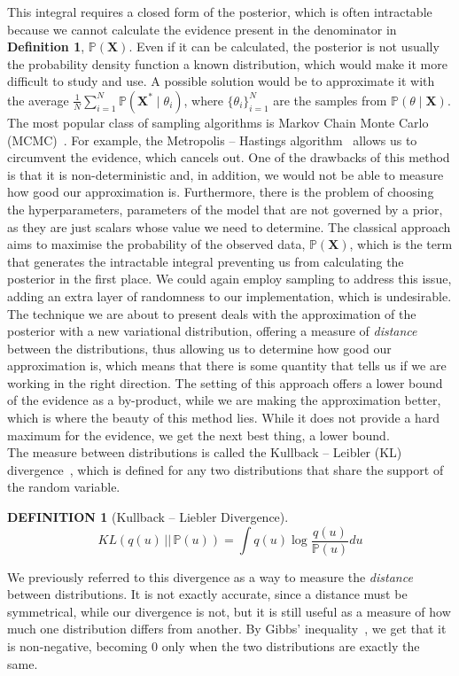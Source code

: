 \documentclass[12pt]{report}
\newtheorem{definition}[theorem]{DEFINITION}
\newcommand{\bs}{\boldsymbol}
\renewcommand{\P}{\mathbb{P}}
\renewcommand{\bs}{\boldsymbol}
\begin{document}
\noindent
This integral requires a closed form of the posterior, which is often intractable because we cannot calculate the evidence present in the denominator in \textbf{Definition 1}, $\P(\bs{X})$. Even if it can be calculated, the posterior is not usually the probability density function a known distribution, which would make it more difficult to study and use. A possible solution would be to approximate it with the average $\frac{1}{N}\sum\limits_{i = 1}^N \P(\bs{X^*} \mid \theta_i)$, where $\{\theta_i\}_{i = 1}^N$ are the samples from $\P(\theta \mid \bs{X})$. The most popular class of sampling algorithms is Markov Chain Monte Carlo (MCMC)~\parencite{mcmc}. For example, the Metropolis -- Hastings algorithm~\parencite{metropolis} allows us to circumvent the evidence, which cancels out. One of the drawbacks of this method is that it is non-deterministic and, in addition, we would not be able to measure how good our approximation is. Furthermore, there is the problem of choosing the hyperparameters, parameters of the model that are not governed by a prior, as they are just scalars whose value we need to determine. The classical approach aims to maximise the probability of the observed data, $\P(\bs{X})$, which is the term that generates the intractable integral preventing us from calculating the posterior in the first place. We could again employ sampling to address this issue, adding an extra layer of randomness to our implementation, which is undesirable. The technique we are about to present deals with the approximation of the posterior with a new variational distribution, offering a measure of \textit{distance} between the distributions, thus allowing us to determine how good our approximation is, which means that there is some quantity that tells us if we are working in the right direction. The setting of this approach offers a lower bound of the evidence as a by-product, while we are making the approximation better, which is where the beauty of this method lies. While it does not provide a hard maximum for the evidence, we get the next best thing, a lower bound. \\

\noindent
The measure between distributions is called the Kullback -- Leibler (KL) divergence~\parencite{kldivergence}, which is defined for any two distributions that share the support of the random variable.

\begin{definition}[Kullback -- Liebler Divergence]
\begin{equation*}
    KL(q(u)\, ||\, \mathbb{P}(u)) = \int q(u) \log \frac{q(u)}{\mathbb{P}(u)} du
\end{equation*}
\end{definition}
\noindent
We previously referred to this divergence as a way to measure the \textit{distance} between distributions. It is not exactly accurate, since a distance must be symmetrical, while our divergence is not, but it is still useful as a measure of how much one distribution differs from another. By Gibbs' inequality~\parencite{gibbs}, we get that it is non-negative, becoming 0 only when the two distributions are exactly the same. \\
\end{document}
